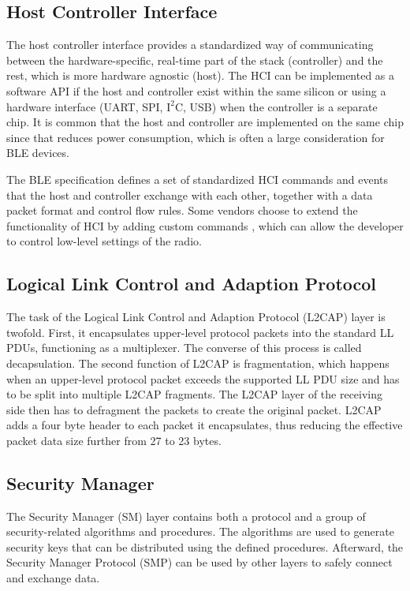 \subsection{Host Controller Interface}
The host controller interface provides a standardized way of communicating between the hardware-specific, real-time part of the stack (controller) and the rest, which is more hardware agnostic (host). The HCI can be implemented as a software API if the host and controller exist within the same silicon or using a hardware interface (UART, SPI, $\text{I}^{2}\text{C}$, USB) when the controller is a separate chip. It is common that the host and controller are implemented on the same chip since that reduces power consumption, which is often a large consideration for BLE devices.

The BLE specification defines a set of standardized HCI commands and events that the host and controller exchange with each other, together with a data packet format and control flow rules\cite{townsend_cufi}. Some vendors choose to extend the functionality of HCI by adding custom commands \cite{ti_ble_dev_guide}, which can allow the developer to control low-level settings of the radio.

\subsection{Logical Link Control and Adaption Protocol}
The task of the Logical Link Control and Adaption Protocol (L2CAP) layer is twofold. First, it encapsulates upper-level protocol packets into the standard LL PDUs, functioning as a multiplexer. The converse of this process is called decapsulation. The second function of L2CAP is fragmentation, which happens when an upper-level protocol packet exceeds the supported LL PDU size and has to be split into multiple L2CAP fragments. The L2CAP layer of the receiving side then has to defragment the packets to create the original packet. L2CAP adds a four byte header to each packet it encapsulates, thus reducing the effective packet data size further from 27 to 23 bytes.

\subsection{Security Manager}
The Security Manager (SM) layer contains both a protocol and a group of security-related algorithms and procedures. The algorithms are used to generate security keys that can be distributed using the defined procedures. Afterward, the Security Manager Protocol (SMP) can be used by other layers to safely connect and exchange data.

